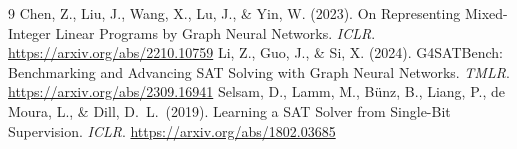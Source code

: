 \documentclass[12pt]{article}
\begin{document}
\begin{thebibliography}{9}
 Chen, Z., Liu, J., Wang, X., Lu, J., \& Yin, W. (2023). On Representing Mixed-Integer Linear Programs by Graph Neural Networks. \emph{ICLR}. \url{https://arxiv.org/abs/2210.10759}
 Li, Z., Guo, J., \& Si, X. (2024). G4SATBench: Benchmarking and Advancing SAT Solving with Graph Neural Networks. \emph{TMLR}. \url{https://arxiv.org/abs/2309.16941}
 Selsam, D., Lamm, M., B{\"u}nz, B., Liang, P., de Moura, L., \& Dill, D.\ L.\ (2019). Learning a SAT Solver from Single-Bit Supervision. \emph{ICLR}. \url{https://arxiv.org/abs/1802.03685}
\end{thebibliography}
\end{document}
